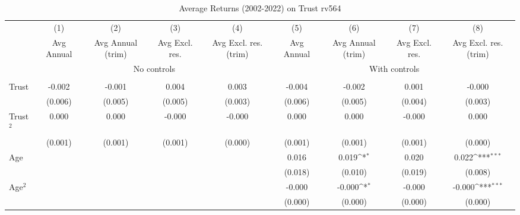 \begin{table}[htbp]\centering
\def\sym#1{\ifmmode^{#1}\else\(^{#1}\)\fi}
\caption{Average Returns (2002-2022) on Trust rv564}
\begin{tabular}{l*{8}{c}}
\toprule
          &\multicolumn{1}{c}{(1)}&\multicolumn{1}{c}{(2)}&\multicolumn{1}{c}{(3)}&\multicolumn{1}{c}{(4)}&\multicolumn{1}{c}{(5)}&\multicolumn{1}{c}{(6)}&\multicolumn{1}{c}{(7)}&\multicolumn{1}{c}{(8)}\\
          &\multicolumn{1}{c}{Avg Annual}&\multicolumn{1}{c}{Avg Annual (trim)}&\multicolumn{1}{c}{Avg Excl. res.}&\multicolumn{1}{c}{Avg Excl. res. (trim)}&\multicolumn{1}{c}{Avg Annual}&\multicolumn{1}{c}{Avg Annual (trim)}&\multicolumn{1}{c}{Avg Excl. res.}&\multicolumn{1}{c}{Avg Excl. res. (trim)}\\
& \multicolumn{4}{c}{No controls} & \multicolumn{4}{c}{With controls} \\\\ \cmidrule(lr){2-5}\cmidrule(lr){6-9}
Trust     &   -0.002         &   -0.001         &    0.004         &    0.003         &   -0.004         &   -0.002         &    0.001         &   -0.000         \\
          &  (0.006)         &  (0.005)         &  (0.005)         &  (0.003)         &  (0.006)         &  (0.005)         &  (0.004)         &  (0.003)         \\
Trust$^{2}$&    0.000         &    0.000         &   -0.000         &   -0.000         &    0.000         &    0.000         &   -0.000         &    0.000         \\
          &  (0.001)         &  (0.001)         &  (0.001)         &  (0.000)         &  (0.001)         &  (0.001)         &  (0.001)         &  (0.000)         \\
Age       &                  &                  &                  &                  &    0.016         &    0.019\sym{*}  &    0.020         &    0.022\sym{***}\\
          &                  &                  &                  &                  &  (0.018)         &  (0.010)         &  (0.019)         &  (0.008)         \\
Age$^{2}$ &                  &                  &                  &                  &   -0.000         &   -0.000\sym{*}  &   -0.000         &   -0.000\sym{***}\\
          &                  &                  &                  &                  &  (0.000)         &  (0.000)         &  (0.000)         &  (0.000)         \\

\end{tabular}
\end{table}
